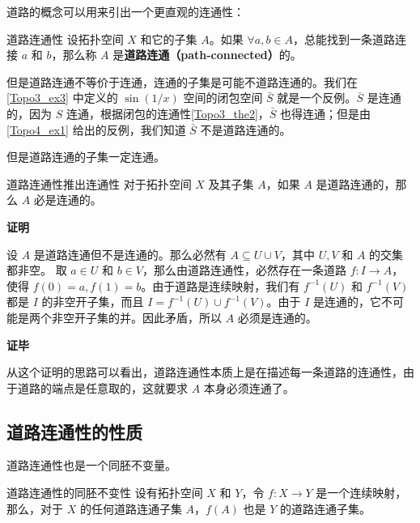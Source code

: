 道路的概念可以用来引出一个更直观的连通性：

\begin{definition}{道路连通性}\label{Topo4_def2}
设拓扑空间 $X$ 和它的子集 $A$。如果 $\forall a, b\in A$，总能找到一条道路连接 $a$ 和 $b$，那么称 $A$ 是\textbf{道路连通（path-connected）}的。
\end{definition}

但是道路连通不等价于连通，连通的子集是可能不道路连通的。我们在\autoref{Topo3_ex3} 中定义的 $\sin(1/x)$ 空间的闭包空间 $\bar{S}$ 就是一个反例。$\bar{S}$ 是连通的，因为 $S$ 连通，根据闭包的连通性\autoref{Topo3_the2}，$\bar{S}$ 也得连通；但是由\autoref{Topo4_ex1} 给出的反例，我们知道 $\bar{S}$ 不是道路连通的。

但是道路连通的子集一定连通。

\begin{theorem}{道路连通性推出连通性}\label{Topo4_the1}
对于拓扑空间 $X$ 及其子集 $A$，如果 $A$ 是道路连通的，那么 $A$ 必是连通的。
\end{theorem}

\textbf{证明}

设 $A$ 是道路连通但不是连通的。那么必然有 $A\subseteq U\cup V$，其中 $U, V$ 和 $A$ 的交集都非空。
取 $a\in U$ 和 $b\in V$，那么由道路连通性，必然存在一条道路 $f:I\rightarrow A$，使得 $f(0)=a, f(1)=b$。由于道路是连续映射，我们有 $f^{-1}(U)$ 和 $f^{-1}(V)$ 都是 $I$ 的非空开子集，而且 $I=f^{-1}(U)\cup f^{-1}(V)$。由于 $I$ 是连通的，它不可能是两个非空开子集的并。因此矛盾，所以 $A$ 必须是连通的。

\textbf{证毕}

从这个证明的思路可以看出，道路连通性本质上是在描述每一条道路的连通性，由于道路的端点是任意取的，这就要求 $A$ 本身必须连通了。

\subsection{道路连通性的性质}

道路连通性也是一个同胚不变量。

\begin{theorem}{道路连通性的同胚不变性}
设有拓扑空间 $X$ 和 $Y$，令 $f:X\rightarrow Y$ 是一个连续映射，那么，对于 $X$ 的任何道路连通子集 $A$，$f(A)$ 也是 $Y$ 的道路连通子集。
\end{theorem}
